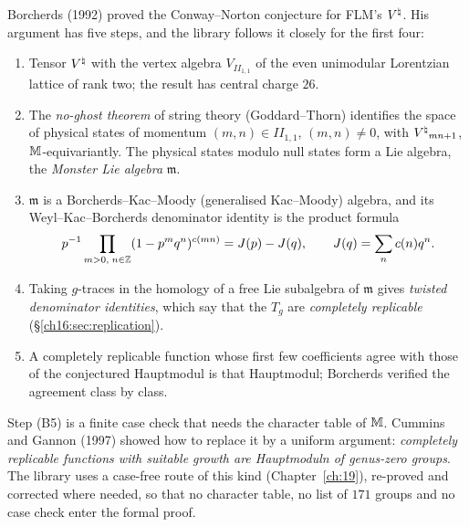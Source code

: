 Borcherds (1992) proved the Conway--Norton conjecture for FLM's ${V^{\natural}}$.  His argument has five steps, and the
library follows it closely for the first four:
\begin{enumerate}[label=(B\arabic*)]
\item Tensor ${V^{\natural}}$ with the vertex algebra $V_{I\!I_{1,1}}$ of the even unimodular Lorentzian lattice of rank
  two; the result has central charge $26$.
\item The \emph{no-ghost theorem} of string theory (Goddard--Thorn) identifies the space of physical states of
  momentum $(m,n)\in I\!I_{1,1}$, $(m,n)\ne0$, with ${V^{\natural}}_{mn+1}$, $\mathbb{M}$-equivariantly.  The physical states
  modulo null states form a Lie algebra, the \emph{Monster Lie algebra} $\mathfrak m$.
\item $\mathfrak m$ is a Borcherds--Kac--Moody (generalised Kac--Moody) algebra, and its Weyl--Kac--Borcherds
  denominator identity is the product formula
  \begin{equation}\label{ch16:eq:denominator}
    p^{-1}\prod_{m>0,\;n\in{\mathbb{Z}}}(1-p^mq^n)^{c(mn)} = J(p)-J(q),\qquad J(q)=\sum_n c(n)q^n .
  \end{equation}
\item Taking $g$-traces in the homology of a free Lie subalgebra of $\mathfrak m$ gives \emph{twisted denominator
  identities}, which say that the $T_g$ are \emph{completely replicable} (\S\ref{ch16:sec:replication}).
\item A completely replicable function whose first few coefficients agree with those of the conjectured Hauptmodul
  is that Hauptmodul; Borcherds verified the agreement class by class.
\end{enumerate}
Step (B5) is a finite case check that needs the character table of $\mathbb{M}$.  Cummins and Gannon (1997) showed
how to replace it by a uniform argument: \emph{completely replicable functions with suitable growth are Hauptmoduln of
genus-zero groups}.  The library uses a case-free route of this kind (Chapter~\ref{ch:19}), re-proved and corrected
where needed, so that no character table, no list of $171$ groups and no case check enter the formal proof.

